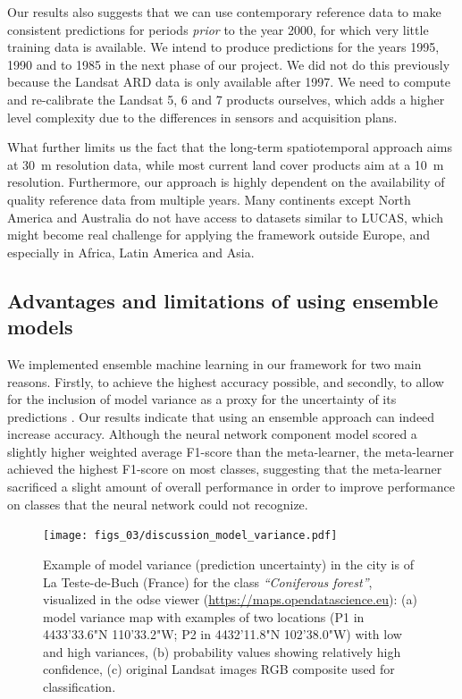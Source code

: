 Our results also suggests that we can use contemporary reference data to make consistent predictions for periods \textit{prior} to the year 2000, for which very little training data is available. We intend to produce predictions for the years 1995, 1990 and to 1985 in the next phase of our project. We did not do this previously because the Landsat ARD data \citep{potapov2020landsat} is only available after 1997. We need to compute and re-calibrate the Landsat 5, 6 and 7 products ourselves, which adds a higher level complexity due to the differences in sensors and acquisition plans.

What further limits us the fact that the long-term spatiotemporal approach aims at 30~m resolution data, while most current land cover products aim at a 10~m resolution. Furthermore, our approach is highly dependent on the availability of quality reference data from multiple years. Many continents except North America and Australia do not have access to datasets similar to LUCAS, which might become real challenge for applying the framework outside Europe, and especially in Africa, Latin America and Asia.
    
\subsection*{Advantages and limitations of using ensemble models}
    
We implemented ensemble machine learning in our framework for two main reasons. Firstly, to achieve the highest accuracy possible, and secondly, to allow for the inclusion of model variance as a proxy for the uncertainty of its predictions \citep{zhang2012ensemble}. Our results indicate that using an ensemble approach can indeed increase accuracy. Although the neural network component model scored a slightly higher weighted average F1-score than the meta-learner, the meta-learner achieved the highest F1-score on most classes, suggesting that the meta-learner sacrificed a slight amount of overall performance in order to improve performance on classes that the neural network could not recognize.
    
\begin{figure}[!hbt]
\centering
\texttt{[image: figs\_03/discussion\_model\_variance.pdf]}
\caption{Example of model variance (prediction uncertainty) in the city is of La Teste-de-Buch (France) for the class \emph{``Coniferous forest''}, visualized in the odse viewer (\url{https://maps.opendatascience.eu}): (a) model variance map with examples of two locations (P1 in 44{\textdegree}33'33.6"N 1{\textdegree}10'33.2"W; P2 in 44{\textdegree}32'11.8"N 1{\textdegree}02'38.0"W) with low and high variances, (b) probability values showing relatively high confidence, (c) original Landsat images RGB composite used for classification.} \label{fig:model_variance}
\end{figure}
    
